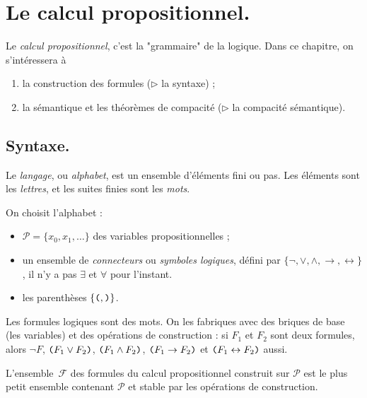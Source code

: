 \documentclass[./main]{subfiles}
\begin{document}
  \chapter{Le calcul propositionnel.}

  Le \textit{calcul propositionnel}, c'est la "grammaire" de la logique.
  Dans ce chapitre, on s'intéressera à
  \begin{enumerate}
    \item la construction des formules ($\triangleright$ la syntaxe) ;
    \item la sémantique et les théorèmes de compacité ($\triangleright$ la compacité sémantique).
  \end{enumerate}

  \section{Syntaxe.}

  \begin{defn}
    Le \textit{langage}, ou \textit{alphabet}, est un ensemble d'éléments fini ou pas.
    Les éléments sont les \textit{lettres}, et les suites finies sont les \textit{mots}.
  \end{defn}

  \begin{defn}
    On choisit l'alphabet :
    \begin{itemize}
      \item $\mathcal{P} = \{x_0, x_1, \ldots\}$ des variables propositionnelles ;
      \item un ensemble de \textit{connecteurs} ou \textit{symboles logiques}, défini par $\{\lnot, \lor, \land, \to, \leftrightarrow\}$, il n'y a pas $\exists$ et $\forall$ pour l'instant.
      \item les parenthèses $\{\verb|(|, \verb|)|\}$.
    \end{itemize}


    Les formules logiques sont des mots. On les fabriques avec des briques de base (les variables) et des opérations de construction : si $F_1$ et $F_2$ sont deux formules, alors $\lnot F$,  $\verb|(| F_1 \lor F_2 \verb|)|$, $\verb|(| F_1 \land F_2 \verb|)|$, $\verb|(| F_1 \to F_2 \verb|)|$ et $\verb|(| F_1 \leftrightarrow F_2 \verb|)|$ aussi.
  \end{defn}

  \begin{defn}
    L'ensemble~$\mathcal{F}$ des formules du calcul propositionnel construit sur $\mathcal{P}$ est le plus petit ensemble contenant $\mathcal{P}$ et stable par les opérations de construction.
  \end{defn}
\end{document}
